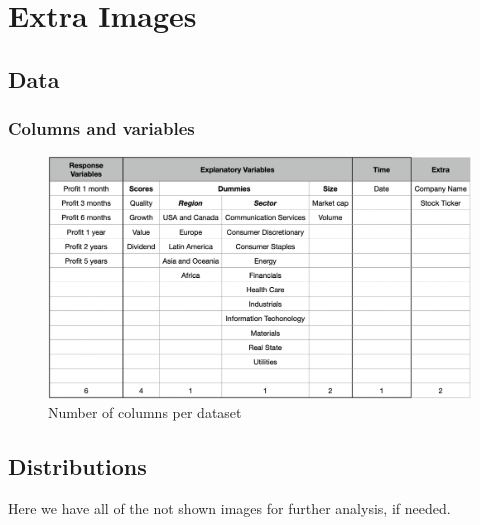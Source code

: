 \documentclass[11pt,english,a4paper,hidelinks]{book}
\begin{document}
\section{Extra Images}
\subsection{Data}

\subsubsection{Columns and variables}

\begin{figure}[H]
    \centering
    \includegraphics[width=1\textwidth]{images/tweenvest/Number of columns.png}
    \caption{Number of columns per dataset}
    \label{fig:number_of_columns}
\end{figure}

\subsection{Distributions}
Here we have all of the not shown images for further analysis, if needed.
\end{document}

